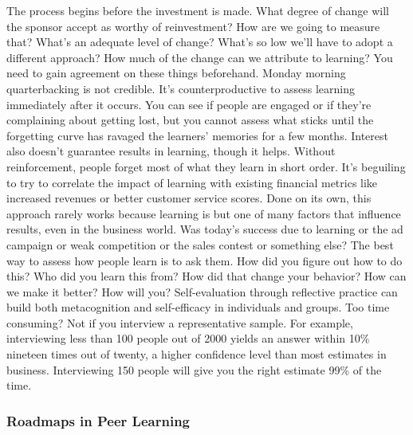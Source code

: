 The process begins before the investment is made. What degree of change
will the sponsor accept as worthy of reinvestment? How are we going to
measure that? What's an adequate level of change? What's so low we'll
have to adopt a different approach? How much of the change can we
attribute to learning? You need to gain agreement on these things
beforehand. Monday morning quarterbacking is not credible. It's
counterproductive to assess learning immediately after it occurs. You
can see if people are engaged or if they're complaining about getting
lost, but you cannot assess what sticks until the forgetting curve has
ravaged the learners' memories for a few months. Interest also doesn't
guarantee results in learning, though it helps. Without reinforcement,
people forget most of what they learn in short order. It's beguiling to
try to correlate the impact of learning with existing financial metrics
like increased revenues or better customer service scores. Done on its
own, this approach rarely works because learning is but one of many
factors that influence results, even in the business world. Was today's
success due to learning or the ad campaign or weak competition or the
sales contest or something else? The best way to assess how people learn
is to ask them. How did you figure out how to do this? Who did you learn
this from? How did that change your behavior? How can we make it better?
How will you? Self-evaluation through reflective practice can build both
metacognition and self-efficacy in individuals and groups. Too time
consuming? Not if you interview a representative sample. For example,
interviewing less than 100 people out of 2000 yields an answer within
10\% nineteen times out of twenty, a higher confidence level than most
estimates in business. Interviewing 150 people will give you the right
estimate 99\% of the time.

\subsubsection{Roadmaps in Peer Learning}

